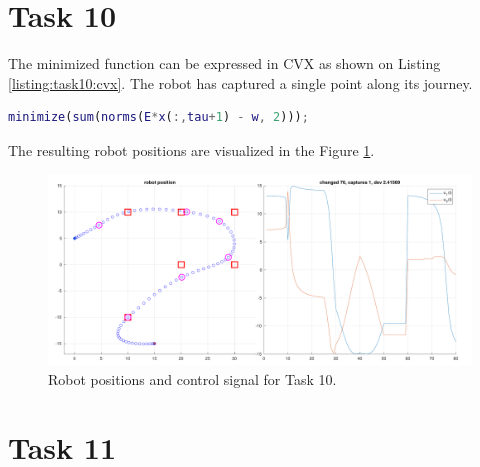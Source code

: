 \section {Task 10}

The minimized function can be expressed in CVX as shown on Listing \ref{listing:task10:cvx}. The robot has captured a single point along its journey.

\begin{lstlisting}[language=Matlab, caption=CVX code for task 10., label=listing:task10:cvx]
minimize(sum(norms(E*x(:,tau+1) - w, 2)));
\end{lstlisting}

The resulting robot positions are visualized in the Figure \ref{fig:task10:graph}.

\begin{figure}[!htb]
    \caption{Robot positions and control signal for Task 10.}
    \label{fig:task10:graph}
    \centering    
    \includegraphics[width=1\linewidth]{part1/figures/task_10.pdf}
\end{figure}

\section {Task 11}

